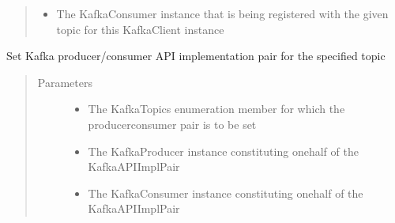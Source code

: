 \documentclass[letterpaper,10pt,english]{sphinxmanual}
\begin{document}
\begin{fulllineitems}
\begin{fulllineitems}
\begin{quote}
\begin{description}
\begin{itemize}
\item {} 
\sphinxAtStartPar
{} \textendash{} The KafkaConsumer instance that is being registered with the given topic for this KafkaClient
instance

\end{itemize}

\end{description}\end{quote}

\end{fulllineitems}


\begin{fulllineitems}
\label{\detokenize{Forge:Forge.KafkaClient.set_kafka_api_impl_pair}}
\sphinxAtStartPar
Set Kafka producer/consumer API implementation pair for the specified topic
\begin{quote}\begin{description}
\item[{Parameters}] \leavevmode\begin{itemize}
\item {} 
\sphinxAtStartPar
{} \textendash{} The KafkaTopics enumeration member for which the producer\sphinxhyphen{}consumer pair is to be set

\item {} 
\sphinxAtStartPar
{} \textendash{} The KafkaProducer instance constituting one\sphinxhyphen{}half of the KafkaAPIImplPair

\item {} 
\sphinxAtStartPar
{} \textendash{} The KafkaConsumer instance constituting one\sphinxhyphen{}half of the KafkaAPIImplPair

\end{itemize}

\end{description}\end{quote}


\end{fulllineitems}
\end{fulllineitems}
\end{document}
